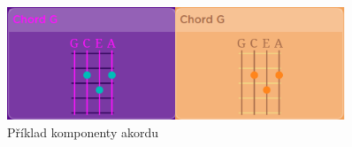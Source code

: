 \begin{figure}[h]
    \centering
    \includegraphics[width=0.9\textwidth]{assets/g_chord.png}
    \caption{Příklad komponenty akordu}
    \label{fig:g_chord}
\end{figure}